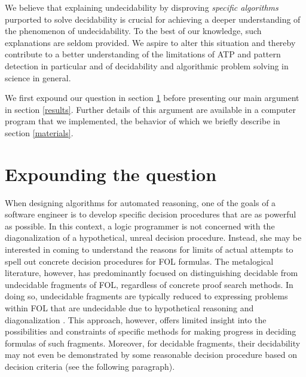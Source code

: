 \documentclass[%
  manuscript=article,   %
  year=2024,
  volume=77,
  doi=00000.000,
]{zfn}
\begin{document}
We believe that explaining undecidability by disproving \emph{specific algorithms} purported to solve decidability is crucial for achieving a deeper understanding of the phenomenon of undecidability. To the best of our knowledge, such explanations are seldom provided. We aspire to alter this situation and thereby contribute to a better understanding of the limitations of ATP and pattern detection in particular and of decidability and algorithmic problem solving in science in general.

We first expound our question in section \ref{question} before presenting our main argument in section \ref{results}. Further details of this argument 
are available in a computer program that we implemented, the behavior of which we briefly describe in section \ref{materials}.

\section{Expounding the question}\label{question}

When designing algorithms for automated reasoning, one of the goals of a software engineer is to develop specific decision procedures that are as powerful as possible. In this context, a logic programmer is not concerned with the diagonalization of a hypothetical, unreal decision procedure. 
Instead, she may be interested in coming to understand the reasons for limits of actual attempts to spell out concrete decision procedures for FOL formulas. 
The metalogical literature, however, has predominantly focused on distinguishing decidable from undecidable fragments of FOL, regardless of concrete proof search methods. In doing so, undecidable fragments are typically reduced to expressing problems within FOL that are undecidable due to hypothetical reasoning and diagonalization \parencite[cf.][]{Boerger_et_al}. This approach, however, offers limited insight into the possibilities and constraints of specific methods for making progress in deciding formulas of such fragments. Moreover, for decidable fragments, their decidability may not even be demonstrated by some reasonable decision procedure based on decision criteria (see the following paragraph).
\end{document}
